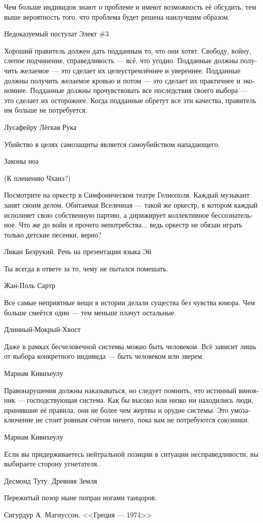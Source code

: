 \documentclass[a4paper,12pt,fleqn]{book}\usepackage{polyglossia}\setdefaultlanguage[babelshorthands=true]{russian}\setotherlanguage{english}\defaultfontfeatures{Ligatures=TeX,Mapping=tex-text}\usepackage{xcolor}\newcommand{\ml}[3]{#2}
\begin{document}
{\epigraph
{Чем больше индивидов знают о проблеме и имеют возможность её обсудить, тем выше вероятность того, что проблема будет решена наилучшим образом.}
{Недоказуемый постулат Элект \#3}

\epigraph
{Хороший правитель должен дать подданным то, что они хотят.
Свободу, войну, слепое подчинение, справедливость --- всё, что угодно.
Подданные должны получить желаемое --- это сделает их целеустремлённее и увереннее.
Подданные должны получить желаемое кровью и потом --- это сделает их практичнее и экономнее.
Подданные должны прочувствовать все последствия своего выбора --- это сделает их осторожнее.
Когда подданные обретут все эти качества, правитель им больше не потребуется.}
{Лусафейру Лёгкая Рука}

\epigraph{
\ml{$0$}
{Убийство в целях самозащиты является самоубийством нападающего.}
{Justifiable homicide is assailant's suicide.}
}{Законы ноа}

(К пленению Чханэ?)

\epigraph
{Посмотрите на оркестр в Симфоническом театре Гелиополя.
Каждый музыкант занят своим делом.
Обитаемая Вселенная --- такой же оркестр, в котором каждый исполняет свою собственную партию, а дирижирует коллективное бессознательное.
Что же до войн и прочего непотребства... ведь оркестр не обязан играть только детские песенки, верно?}
{Ликан Безрукий.
Речь на презентации языка Эй}

\epigraph
{Ты всегда в ответе за то, чему не пытался помешать.}
{Жан-Поль Сартр}

\epigraph
{Все самые неприятные вещи в истории делали существа без чувства юмора.
Чем больше смеётся один --- тем меньше плачут остальные.}
{Длинный-Мокрый-Хвост}

\epigraph
{Даже в рамках бесчеловечной системы можно быть человеком.
Всё зависит лишь от выбора конкретного индивида --- быть человеком или зверем.}
{Мариам Кивихеулу}

\epigraph
{Правонарушения должны наказываться, но следует помнить, что истинный виновник --- господствующая система.
Как бы высоко или низко ни находились люди, принявшие её правила, они не более чем жертвы и орудие системы.
Это умозаключение не стоит ровным счётом ничего, пока вам не потребуются союзники.}
{Мариам Кивихеулу}

\epigraph
{Если вы придерживаетесь нейтральной позиции в ситуации несправедливости, вы выбираете сторону угнетателя.}
{Десмонд Туту. Древняя Земля}

\epigraph
{Пережитый позор ныне попран ногами танцоров.}
{Сигурдур А. Магнуссон. <<Греция --- 1974>>}

}
\end{document}
